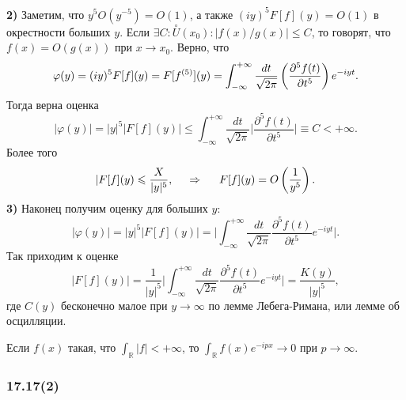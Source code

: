  \textbf{2)} Заметим, что $y^5 O(y^{-5}) = O(1)$, а также $(i y)^5 F[f](y) = O(1)$ в окрестности больших $y$. 
 Если $\exists C \colon  \overset{\circ}{U} (x_0) \colon  |f(x)/g(x)| \leq C$, то говорят, что
 $f(x) = O(g(x))$ при $x \to x_0$. Верно, что
 \begin{equation*}
     \varphi(y) = (iy)^5 F[f](y) = F[f^{(5)}] (y) 
     = \int_{-\infty}^{+\infty}
     \frac{dt}{\sqrt{2\pi}} 
     \l(
         \frac{\partial^5 f(t)}{\partial t^5} 
     \r) e^{-iyt}.
 \end{equation*}
 Тогда верна оценка
 \begin{equation*}
     |\varphi(y)| = |y|^5 |F[f](y)| \leq 
     \int_{-\infty}^{+\infty} \frac{dt}{\sqrt{2\pi}} 
     \bigg|
         \frac{\partial^5 f(t)}{\partial t^5 } 
     \bigg| \equiv C < + \infty.
 \end{equation*}
 Более того
 \begin{equation*}
     |F[f](y) \leq \frac{X}{|y|^5},
     \hspace{0.5cm} \Rightarrow \hspace{0.5cm}
     F[f](y) = O\left(
        \frac{1}{y^5}
     \right).
 \end{equation*}
 \textbf{3)} Наконец получим оценку для больших $y$:
 \begin{equation*}
     |\varphi(y)| = |y|^5 \bigg|
         F[f](y)
     \bigg| = \bigg|
         \int_{-\infty}^{+\infty} \frac{dt}{\sqrt{2\pi}}
         \frac{\partial^5 f(t)}{\partial t^5}  e^{-i y t}
     \bigg|.
 \end{equation*}
 Так приходим к оценке
 \begin{equation*}
     \bigg|
         F[f](y)
     \bigg| = \frac{1}{|y|^5} \bigg|
         \int_{-\infty}^{+\infty} 
         \frac{dt}{\sqrt{2\pi}} \frac{\partial^5 f(t)}{\partial t^5}  e^{-i y t}
     \bigg| = \frac{K(y)}{|y|^5},
 \end{equation*}
 где $C(y)$ бесконечно малое при $y \to \infty$ по лемме Лебега-Римана, или лемме об осцилляции. 


\begin{to_lem}
    Если $f(x)$ такая, что $\int_{\mathbb{R}} |f| < + \infty$, то $\int_{\mathbb{R}} f(x) e^{-ipx} \to 0$ при $p \to \infty$.
\end{to_lem}


\subsubsection*{17.17(2)}

